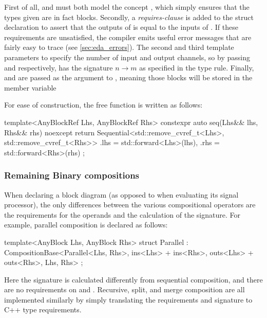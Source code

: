 First of all,  and  must both model the concept , which simply
ensures that the types given are in fact blocks. Secondly, a \emph{requires-clause} is added to the struct
declaration to assert that the outputs of  is equal to the inputs of . If these requirements are unsatisfied,
the compiler emits useful error messages that are fairly easy to trace (see \autoref{sec:eda_errors}). The
second and third template parameters to  specify the number of input and output
channels, so by passing  and  respectively,
 has the signature $n \rightarrow m$ as specified in the type rule. Finally,  and
 are passed as the  argument to , meaning those blocks will be stored
in the  member variable

For ease of construction, the free function  is written as follows:

\begin{cppcodenl}
  template<AnyBlockRef Lhs, AnyBlockRef Rhs>
  constexpr auto seq(Lhs&& lhs, Rhs&& rhs) noexcept
  {
    return Sequential<std::remove_cvref_t<Lhs>, std::remove_cvref_t<Rhs>>{ 
      .lhs = std::forward<Lhs>(lhs), 
      .rhs = std::forward<Rhs>(rhs)
    };
  }
\end{cppcodenl}

\subsubsection{Remaining Binary compositions}

When declaring a block diagram (as opposed to when evaluating its signal processor), the only differences
between the various compositional operators are the requirements for the operands and the calculation of the
signature. For example, parallel composition is declared as follows:

\begin{cppcodenl}
  template<AnyBlock Lhs, AnyBlock Rhs>
  struct Parallel : CompositionBase<Parallel<Lhs, Rhs>, ins<Lhs> + ins<Rhs>, outs<Lhs> + outs<Rhs>, Lhs, Rhs> {};
\end{cppcodenl}

Here the signature is calculated differently from sequential composition, and there are no requirements on
 and . Recursive, split, and merge composition are all
implemented similarly by simply translating the requirements and signature to C++ type requirements.


